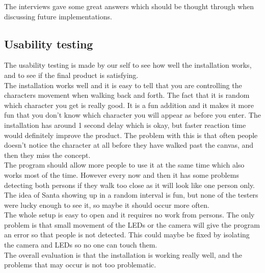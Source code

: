 The interviews gave some great answers which should be thought through when discussing future implementations.   
  
\subsection{Usability testing}

The usability testing is made by our self to see how well the installation works, and to see if the final product is satisfying. \\
The installation works well and it is easy to tell that you are controlling the characters movement when walking back and forth. The fact that it is random which character you get is really good. It is a fun addition and it makes it more fun that you don't know which character you will appear as before you enter. The installation has around 1 second delay which is okay, but faster reaction time would definitely improve the product. The problem with this is that often people doesn't notice the character at all before they have walked past the canvas, and then they miss the concept. \\
The program should allow more people to use it at the same time which also works most of the time. However every now and then it has some problems detecting both persons if they walk too close as it will look like one person only.
The idea of Santa showing up in a random interval is fun, but none of the testers were lucky enough to see it, so maybe it should occur more often.\\
The whole setup is easy to open and it requires no work from persons. The only problem is that small movement of the LEDs or the camera will give the program an error so that people is not detected. This could maybe be fixed by isolating the camera and LEDs so no one can touch them.\\
The overall evaluation is that the installation is working really well, and the problems that may occur is not too problematic. 

